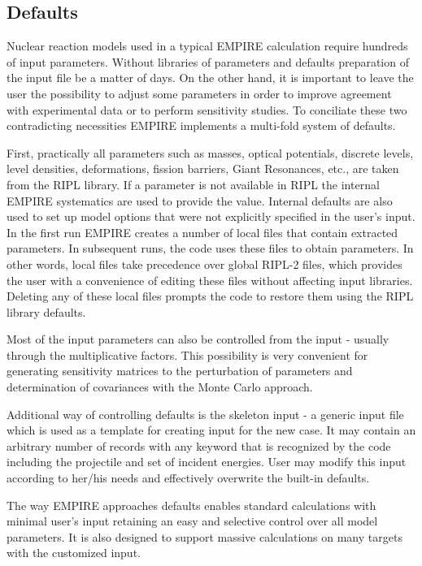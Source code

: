 \subsection{Defaults}

Nuclear reaction models used in a typical EMPIRE calculation require
hundreds of input parameters. Without libraries of parameters and defaults
preparation of the input file be a matter of days. On the other hand, it is
important to leave the user the possibility to adjust some parameters in
order to improve agreement with experimental data or to perform sensitivity
studies. To conciliate these two contradicting necessities EMPIRE implements
a multi-fold system of defaults.

First, practically all parameters such as masses, optical potentials,
discrete levels, level densities, deformations, fission barriers, Giant
Resonances, etc., are taken from the RIPL library. If a parameter is not
available in RIPL the internal EMPIRE systematics are used to provide the
value. Internal defaults are also used to set up model options that were not
explicitly specified in the user's input. In the first run EMPIRE creates a
number of local files that contain extracted parameters. In subsequent runs,
the code uses these files to obtain parameters. In other words, local files
take precedence over global RIPL-2 files, which provides the user with a
convenience of editing these files without affecting input libraries.
Deleting any of these local files prompts the code to restore them using the
RIPL library defaults.

Most of the input parameters can also be controlled from the input - usually
through the multiplicative factors. This possibility is very convenient for
generating sensitivity matrices to the perturbation of parameters and
determination of covariances with the Monte Carlo approach.

Additional way of controlling defaults is the skeleton input - a generic
input file which is used as a template for creating input for the new case.
It may contain an arbitrary number of records with any keyword that is
recognized by the code including the projectile and set of incident
energies. User may modify this input according to her/his needs and
effectively overwrite the built-in defaults.

The way EMPIRE approaches defaults enables standard calculations with
minimal user's input retaining an easy and selective control over all model
parameters. It is also designed to support massive calculations on many
targets with the customized input.

